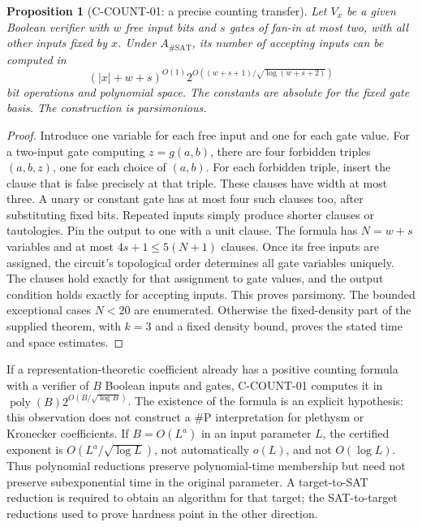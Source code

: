 \documentclass[11pt,a4paper]{article}
\newtheorem{proposition}{Proposition}[section]
\begin{document}
\begin{proposition}[C-COUNT-01: a precise counting transfer]
Let \(V_x\) be a given Boolean verifier with \(w\) free input bits and
\(s\) gates of fan-in at most two, with all other inputs fixed by \(x\).
Under \(A_{\#\mathrm{SAT}}\), its number of accepting inputs can be computed
in
\[
 (|x|+w+s)^{O(1)}
 2^{O((w+s+1)/\sqrt{\log(w+s+2)})}
\]
bit operations and polynomial space.  The constants are absolute for
the fixed gate basis.  The construction is parsimonious.
\end{proposition}
\begin{proof}
Introduce one variable for each free input and one for each gate value.
For a two-input gate computing \(z=g(a,b)\), there are four forbidden
triples \((a,b,z)\), one for each choice of \((a,b)\).  For each forbidden
triple, insert the clause that is false precisely at that triple.
These clauses have width at most three.  A unary or constant gate has
at most four such clauses too, after substituting fixed bits.  Repeated
inputs simply produce shorter clauses or tautologies.  Pin the output
to one with a unit clause.  The formula has \(N=w+s\) variables and
at most \(4s+1\le5(N+1)\) clauses.  Once its free inputs are assigned,
the circuit's topological order determines all gate variables uniquely.
The clauses hold exactly for that assignment to gate values, and the
output condition holds exactly for accepting inputs.  This proves
parsimony.  The bounded exceptional cases \(N<20\) are enumerated.
Otherwise the fixed-density part of the supplied theorem, with \(k=3\)
and a fixed density bound, proves the stated time and space estimates.
\end{proof}

If a representation-theoretic coefficient already has a positive counting
formula with a verifier of \(B\) Boolean inputs and gates, C-COUNT-01
computes it in \(\operatorname{poly}(B)2^{O(B/\sqrt{\log B})}\).
The existence of the formula is an explicit hypothesis: this observation
does not construct a \(\#\mathrm P\) interpretation for plethysm or
Kronecker coefficients.  If \(B=O(L^a)\) in an input parameter \(L\),
the certified exponent is \(O(L^a/\sqrt{\log L})\), not automatically
\(o(L)\), and not \(O(\log L)\).  Thus polynomial reductions preserve
polynomial-time membership but need not preserve subexponential time
in the original parameter.  A target-to-SAT reduction is required to
obtain an algorithm for that target; the SAT-to-target reductions used
to prove hardness point in the other direction.
\end{document}
